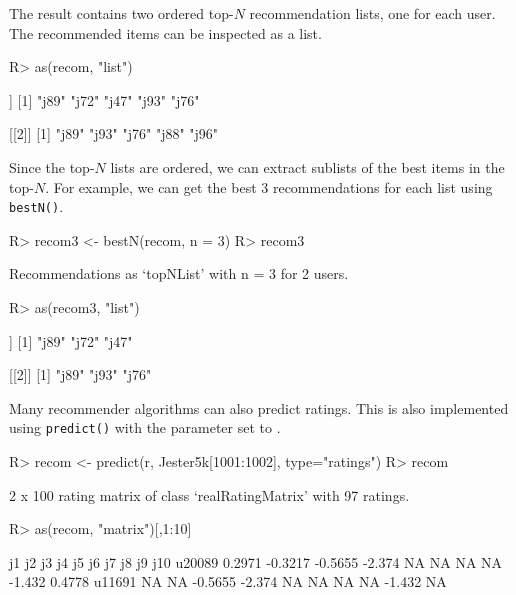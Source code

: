 \documentclass[nojss]{jss}
\newcommand{\func}[1]{\mbox{\texttt{#1()}}}
\begin{document}
The result contains two ordered top-$N$ recommendation lists,
one for each user. The recommended items can be inspected as a list.
\begin{Schunk}
\begin{Sinput}
R> as(recom, "list")
\end{Sinput}
\begin{Soutput}
[[1]]
[1] "j89" "j72" "j47" "j93" "j76"

[[2]]
[1] "j89" "j93" "j76" "j88" "j96"
\end{Soutput}
\end{Schunk}

Since the top-$N$ lists are ordered, we can extract sublists of
the best items in the top-$N$. For example, we can get the best 3
recommendations for each list using \func{bestN}.
\begin{Schunk}
\begin{Sinput}
R> recom3 <- bestN(recom, n = 3)
R> recom3
\end{Sinput}
\begin{Soutput}
Recommendations as ‘topNList’ with n = 3 for 2 users.
\end{Soutput}
\begin{Sinput}
R> as(recom3, "list")
\end{Sinput}
\begin{Soutput}
[[1]]
[1] "j89" "j72" "j47"

[[2]]
[1] "j89" "j93" "j76"
\end{Soutput}
\end{Schunk}


Many recommender algorithms can also predict ratings. This is also
implemented using \func{predict} with the parameter 
set to .

\begin{Schunk}
\begin{Sinput}
R> recom <- predict(r, Jester5k[1001:1002], type="ratings")
R> recom
\end{Sinput}
\begin{Soutput}
2 x 100 rating matrix of class ‘realRatingMatrix’ with 97 ratings.
\end{Soutput}
\begin{Sinput}
R> as(recom, "matrix")[,1:10]
\end{Sinput}
\begin{Soutput}
           j1      j2      j3     j4 j5 j6 j7 j8     j9    j10
u20089 0.2971 -0.3217 -0.5655 -2.374 NA NA NA NA -1.432 0.4778
u11691     NA      NA -0.5655 -2.374 NA NA NA NA -1.432     NA
\end{Soutput}
\end{Schunk}
\end{document}

